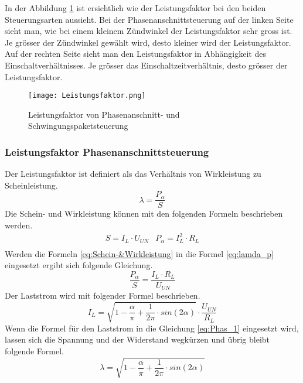 In der Abbildung \ref{fig:Leistungsfaktor} ist ersichtlich wie der Leistungsfaktor bei den beiden Steuerungsarten aussieht. Bei der Phasenanschnittsteuerung auf der linken Seite sieht man, wie bei einem kleinem Zündwinkel der Leistungsfaktor sehr gross ist. Je grösser der Zündwinkel gewählt wird, desto kleiner wird der Leistungsfaktor. Auf der rechten Seite sieht man den Leistungsfaktor in Abhängigkeit des Einschaltverhältnisses. Je grösser das Einschaltzeitverhältnis, desto grösser der Leistungsfaktor.  
\begin{figure}[ht!]
	\centering
	\texttt{[image: Leistungsfaktor.png]}	
	\caption{Leistungsfaktor von Phasenanschnitt- und Schwingungspaketsteuerung}\label{fig:Leistungsfaktor}
\end{figure}

\subsubsection{Leistungsfaktor Phasenanschnittsteuerung}
Der Leistungsfaktor ist definiert als das Verhältnis von Wirkleistung zu Scheinleistung. 
\begin{equation}\label{eq:lamda_p}
\lambda = \frac{P_{\alpha}}{S}
\end{equation}
Die Schein- und Wirkleistung können mit den folgenden Formeln beschrieben werden.
\begin{equation}\label{eq:Schein-&Wirkleistung}
\begin{array}{cc} 
S = I_L \cdot U_{UN}   &   P_{\alpha} = I_L^2 \cdot R_L  \\
\end{array}
\end{equation}
Werden die Formeln \ref{eq:Schein-&Wirkleistung} in die Formel \ref{eq:lamda_p} eingesetzt ergibt sich folgende Gleichung. 
\begin{equation} \label{eq:Phas_1}
\frac{P_{\alpha}}{S} = \frac{I_L \cdot R_L}{U_{UN}}
\end{equation}
Der Laststrom wird mit folgender Formel beschrieben.
\begin{equation}
I_L = \sqrt{1-\frac{\alpha}{\pi}+\frac{1}{2\pi} \cdot sin(2\alpha)} \cdot \frac{U_{UN}}{R_L}
\end{equation}
Wenn die Formel für den Laststrom in die Gleichung \ref{eq:Phas_1} eingesetzt wird, lassen sich die Spannung und der Widerstand wegkürzen und übrig bleibt folgende Formel.
\begin{equation}
\lambda = \sqrt{1-\frac{\alpha}{\pi}+\frac{1}{2\pi} \cdot sin(2\alpha)}
\end{equation}


